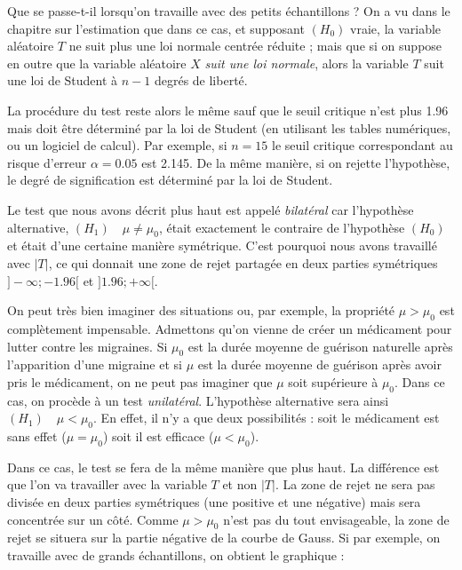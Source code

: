 \documentclass[12pt, a4paper]{book}
\numberwithin{equation}{section}
\begin{document}

Que se passe-t-il lorsqu'on travaille avec des petits échantillons ?
On a vu dans le chapitre sur l'estimation que dans ce cas, et supposant $(H_0)$ vraie, la variable aléatoire $T$ ne suit plus
une loi normale centrée réduite ; mais que si on suppose en outre que la variable aléatoire 
$X$ 	{\it suit une loi normale}, alors la variable $T$ suit une loi de Student à $n-1$ degrés de liberté. 

La procédure du test reste alors le même sauf que le seuil critique n'est plus 1.96 mais doit être
déterminé par la loi de Student (en utilisant les tables numériques, ou un logiciel de calcul).
Par exemple, si $n=15$ le seuil critique correspondant au risque d'erreur $\alpha = 0.05$ est 2.145.
De la même manière, si on rejette l'hypothèse, le degré de signification est déterminé par la loi de 
Student.\\



Le test que nous avons décrit plus haut est appelé {\it bilatéral} car l'hypothèse alternative, 
$(H_1)\quad \mu\neq\mu_0$, était exactement le contraire de l'hypothèse $(H_0)$ et était 
d'une certaine manière symétrique. C'est pourquoi nous avons travaillé avec $|T|$, ce qui donnait une 
zone de rejet partagée en deux parties symétriques $]-\infty ; -1.96[$ et $]1.96 ; +\infty[$.

On peut très bien imaginer des situations ou, par exemple, la propriété $\mu>\mu_0$ est complètement 
impensable. Admettons qu'on vienne de créer un médicament pour lutter contre les migraines.
Si $\mu_0$ est la durée moyenne de guérison naturelle après l'apparition d'une migraine et si 
$\mu$ est la durée moyenne de guérison après avoir pris le médicament, on ne peut pas imaginer que $\mu$ soit 
supérieure à $\mu_0$. Dans ce cas, on procède à un test {\it unilatéral}.
L'hypothèse alternative sera ainsi $(H_1)\quad \mu < \mu_0$. En effet, il n'y a que deux possibilités :
soit le médicament est sans effet ($\mu=\mu_0$) soit il est efficace ($\mu < \mu_0$).

Dans ce cas, le test se fera de la même manière que plus haut. La différence est que l'on va travailler avec
la variable $T$ et non $|T|$. La zone de rejet ne sera pas divisée en deux parties symétriques 
(une positive et une négative) mais sera 
concentrée sur un côté. Comme $\mu>\mu_0$ n'est pas du tout envisageable, la zone de rejet se situera 
sur la partie négative de la courbe de Gauss. Si par exemple, on travaille avec de grands échantillons, on obtient le graphique :
\end{document}

